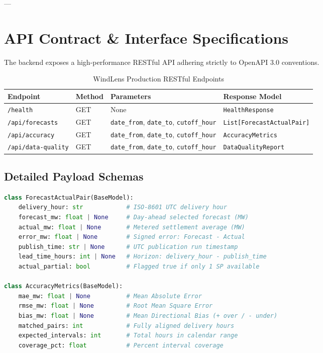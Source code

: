 \documentclass[11pt,a4paper]{article}
\begin{document}
---

\section{API Contract \& Interface Specifications}

The backend exposes a high-performance RESTful API adhering strictly to OpenAPI 3.0 conventions.

\begin{table}[h!]
\centering
\small
\begin{tabular}{@{}llll@{}}
\toprule
\textbf{Endpoint} & \textbf{Method} & \textbf{Parameters} & \textbf{Response Model} \\ \midrule
\texttt{/health} & GET & None & \texttt{HealthResponse} \\
\texttt{/api/forecasts} & GET & \texttt{date\_from}, \texttt{date\_to}, \texttt{cutoff\_hour} & \texttt{List[ForecastActualPair]} \\
\texttt{/api/accuracy} & GET & \texttt{date\_from}, \texttt{date\_to}, \texttt{cutoff\_hour} & \texttt{AccuracyMetrics} \\
\texttt{/api/data-quality} & GET & \texttt{date\_from}, \texttt{date\_to}, \texttt{cutoff\_hour} & \texttt{DataQualityReport} \\ \bottomrule
\end{tabular}
\caption{WindLens Production RESTful Endpoints}
\end{table}

\subsection{Detailed Payload Schemas}
\begin{lstlisting}[language=Python, caption={Pydantic v2 Core Domain Schemas}]
class ForecastActualPair(BaseModel):
    delivery_hour: str            # ISO-8601 UTC delivery hour
    forecast_mw: float | None     # Day-ahead selected forecast (MW)
    actual_mw: float | None       # Metered settlement average (MW)
    error_mw: float | None        # Signed error: Forecast - Actual
    publish_time: str | None      # UTC publication run timestamp
    lead_time_hours: int | None   # Horizon: delivery_hour - publish_time
    actual_partial: bool          # Flagged true if only 1 SP available

class AccuracyMetrics(BaseModel):
    mae_mw: float | None          # Mean Absolute Error
    rmse_mw: float | None         # Root Mean Square Error
    bias_mw: float | None         # Mean Directional Bias (+ over / - under)
    matched_pairs: int            # Fully aligned delivery hours
    expected_intervals: int       # Total hours in calendar range
    coverage_pct: float           # Percent interval coverage
\end{lstlisting}
\end{document}
